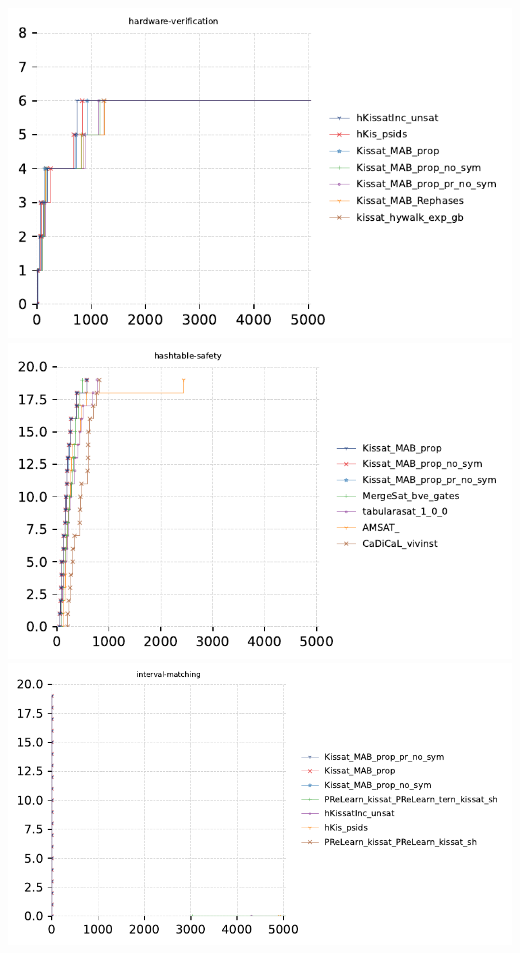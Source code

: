 \documentclass{article}
\begin{document}
\includegraphics[width=\linewidth]{gen/sc2023/cdfs/cdf-hardware-verification.pdf}
\includegraphics[width=\linewidth]{gen/sc2023/cdfs/cdf-hashtable-safety.pdf}
\includegraphics[width=\linewidth]{gen/sc2023/cdfs/cdf-interval-matching.pdf}
\end{document}
